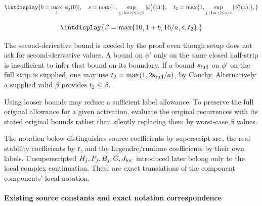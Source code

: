 \begingroup\renewcommand{\theHequation}{intdisplay.234}
\begin{equation*}
\intdisplay{
b=\max_j|\phi_j(0)|,\quad
s=\max\{1,\sup_{j,|\operatorname{Im}z|\le a/2}|\phi_j'(z)|\},\quad
t_2=\max\{1,\sup_{j,|\operatorname{Im}z|\le a/2}|\phi_j''(z)|\},
}
\end{equation*}
\endgroup

\begingroup\renewcommand{\theHequation}{intdisplay.235}
\begin{equation*}
\intdisplay{
\beta=\max\{10,1+b,16/a,s,t_2\}.
}
\end{equation*}
\endgroup


The second-derivative bound is needed by the proof even though setup does not ask for second-derivative values. A bound on \(\phi'\) only on the same closed half-strip is insufficient to infer that bound on its boundary. If a bound \(s_{\rm full}\) on \(\phi'\) on the full strip is supplied, one may use \(t_2=\max(1,\allowbreak 2s_{\rm full}/a)\), by Cauchy. Alternatively a supplied valid \(\beta\) provides \(t_2\le\beta\).



Using looser bounds may reduce a sufficient label allowance. To preserve the full original allowance for a given activation, evaluate the original recurrences with its stated original bounds rather than silently replacing them by worst-case \(\beta\) values.



The notation below distinguishes source coefficients by superscript \({\rm src}\), the real stability coefficients by \({\rm r}\), and the Legendre/runtime coefficients by their own labels. Unsuperscripted \(H_j,\allowbreak P_j,\allowbreak B_j,\allowbreak G,\allowbreak J_{\rm loc}\) introduced later belong only to the local complex continuation. These are exact translations of the component components' local notation.


\paragraph{Existing source constants and exact notation correspondence}
\label{int:setup-orders-detail-2}
\mbox{}\par\smallskip


